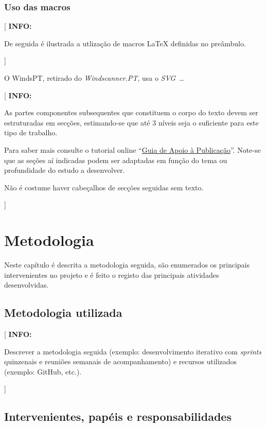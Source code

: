 \documentclass[11pt,a4paper]{report}
\newcommand{\windspt}{\textsf{WindsPT\/}}
\newcommand{\windscannerpt}{\emph{Windscanner.PT\/}}
\newcommand{\class}[1]{{\normalfont\slshape #1\/}}
\newcommand{\svg}{\class{SVG}}
\newenvironment{info}[1]{\vspace*{6mm}\color{blue}
                            [ \textbf{INFO:} \begin{em} #1}
                        {\vspace*{3mm}\end{em} ]}
\begin{document}
\subsection*{Uso das macros}

\begin{info}
De seguida é ilustrada a utlização de macros \LaTeX{} definidas no
preâmbulo.
\end{info}

O \windspt, retirado do \windscannerpt, usa o \svg\ \ldots

\lipsum[2]

\begin{info}
As partes componentes subsequentes que constituem o corpo do texto
devem ser estruturadas em secções, estimando-se que até 3 níveis seja
o suficiente para este tipo de trabalho.

Para saber mais consulte o tutorial online 
``\href{https://docs.google.com/document/d/1TDC1behVq8x7fQL4CcPEEh_np5GXviJevQxnQ9gbiJs/edit}
{Guia de Apoio à Publicação}''.
Note-se que as seções aí indicadas podem ser adaptadas em função do tema
ou profundidade do estudo a desenvolver.

Não é costume haver cabeçalhos de secções seguidas sem texto.
\end{info}



\chapter{Metodologia}

Neste capítulo é descrita a metodologia seguida, são enumerados os
principais intervenientes no projeto e é feito o registo das
principais atividades desenvolvidas.

\section{Metodologia utilizada}

\begin{info}
Descrever a metodologia seguida (exemplo: desenvolvimento iterativo
com \emph{sprints} quinzenais e reuniões semanais de acompanhamento) e
recursos utilizados (exemplo: GitHub, etc.).
\end{info}

\section{Intervenientes, papéis e responsabilidades}
\end{document}
